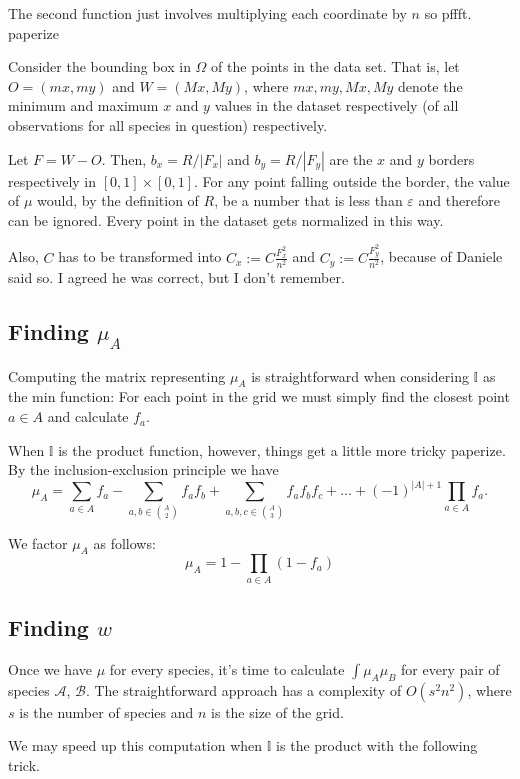 \documentclass[12pt]{article}
\numberwithin{equation}{section} %
\numberwithin{figure}{section} %
\def\cA{{\mathcal{A}}}
\def\cB{{\mathcal{B}}}
\def\II{{\mathbb{I}}}
\theoremstyle{definition}
\def\tcr#1{\textcolor{MyRed}{#1}}
\begin{document}
	The second function just involves multiplying each coordinate by $n$ so pffft. \tcr{paperize} 
	
	Consider the bounding box in $\Omega$ of the points in the data set. That is, let $O=(mx,my)$ and $W=(Mx,My)$, where $mx,my,Mx,My$ denote the minimum and maximum $x$ and $y$ values in the dataset respectively (of all observations for all species in question) respectively.
	
	Let $F=W-O$. Then, $b_x = R/|F_x|$ and $b_y = R/|F_y|$ are the $x$ and $y$ borders respectively in $[0,1]\times[0,1]$. For any point falling outside the border, the value of $\mu$ would, by the definition of $R$, be a number that is less than $\varepsilon$ and therefore can be ignored. Every point in the dataset gets normalized in this way.
	
	Also, $C$ has to be transformed into $C_x := C\frac{F_x^2}{n^2}$ and $C_y :=  C\frac{F_y^2}{n^2}$, because of \tcr{Daniele said so. I agreed he was correct, but I don't remember.}

\subsection{Finding \texorpdfstring{$\mu_A$}{mu\_A}}
Computing the matrix representing $\mu_A$ is straightforward when considering $\II$ as the min function: For each point in the grid we must simply find the closest point $a\in A$ and calculate $f_a$.

When $\II$ is the product function, however, things get a little more tricky \tcr{paperize}. By the inclusion-exclusion principle we have
	$$\mu_A = \sum_{a\in A} f_{a} - \sum_{a,b \in \binom{A}{2}} f_a f_b + \sum_{a,b,c \in \binom{A}{3} } f_a f_{b} f_{c} + \dots + (-1)^{|A|+1} \prod_{a\in A} f_a.$$

	We factor $\mu_A$ as follows:
$$\mu_A = 1-\prod_{a\in A} (1-f_a)$$

	

	\subsection{Finding \texorpdfstring{$w$}{w}}
	
	Once we have $\mu$ for every species, it's time to calculate $\int \mu_A\mu_B$ for every pair of species $\cA$, $\cB$. The straightforward approach has a complexity of $O(s^2n^2)$, where $s$ is the number of species and $n$ is the size of the grid.
	
	We may speed up this computation when $\II$ is the product with the following trick. 
	
\end{document}
